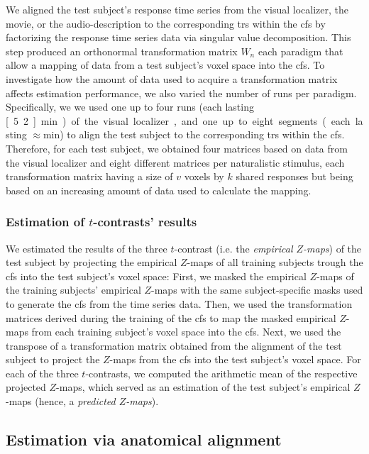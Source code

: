 %
We aligned the test subject's response time series from the visual localizer,
the movie, or the audio-description to the corresponding \acp{tr} within the
\ac{cfs} by factorizing the response time series data via singular value
decomposition.
%
This step produced an orthonormal transformation matrix $W_{n}$ each paradigm
that allow a mapping of data from a test subject's voxel space into the
\ac{cfs}.
%
To investigate how the amount of data used to acquire a transformation matrix
affects estimation performance, we also varied the number of runs per paradigm.
%
Specifically, we we used one up to four runs (each lasting \unit[5.2]{min}) of the
visual localizer, and one up to eight segments (each lasting
$\approx$\unit[15]{min}) to align the test subject to the corresponding \acp{tr}
within the \ac{cfs}.
%
Therefore, for each test subject, we obtained four matrices based on data from
the visual localizer and eight different matrices per naturalistic stimulus,
each transformation matrix having a size of $v$ voxels by $k$ shared responses
but being based on an increasing amount of data used to calculate the mapping.


\subsubsection{Estimation of $t$-contrasts' results}

We estimated the results of the three $t$-contrast (i.e. the \textit{empirical
$Z$-maps}) of the test subject by projecting the empirical $Z$-maps of all
training subjects trough the \ac{cfs} into the test subject's voxel space:
First, we masked the empirical $Z$-maps of the training subjects' empirical
$Z$-maps with the same subject-specific masks used to generate the \ac{cfs} from
the time series data.
%
Then,  we used the transformation matrices derived during the training of the
\ac{cfs} to map the masked empirical $Z$-maps from each training subject's voxel
space into the \ac{cfs}.
%
Next, we used the transpose of a transformation matrix obtained from the
alignment of the test subject to project the $Z$-maps from the \ac{cfs} into the
test subject's voxel space.
For each of the three $t$-contrasts, we computed the arithmetic mean of the
respective projected $Z$-maps, which served as an estimation of the test
subject's empirical $Z$-maps (hence, a \textit{predicted $Z$-maps}).

\subsection{Estimation via anatomical alignment}

